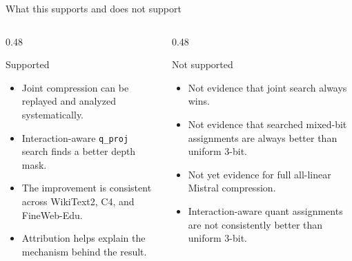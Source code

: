 \documentclass[aspectratio=169]{beamer}
\begin{document}
\begin{frame}{What this supports and does not support}
\begin{columns}[T]
\begin{column}{0.48\textwidth}
\begin{block}{Supported}
\begin{itemize}
    \item Joint compression can be replayed and analyzed systematically.
    \item Interaction-aware \texttt{q\_proj} search finds a better depth mask.
    \item The improvement is consistent across WikiText2, C4, and FineWeb-Edu.
    \item Attribution helps explain the mechanism behind the result.
\end{itemize}
\end{block}
\end{column}

\begin{column}{0.48\textwidth}
\begin{block}{Not supported}
\begin{itemize}
    \item Not evidence that joint search always wins.
    \item Not evidence that searched mixed-bit assignments are always better than uniform 3-bit.
    \item Not yet evidence for full all-linear Mistral compression.
    \item Interaction-aware quant assignments are not consistently better than uniform 3-bit.
\end{itemize}
\end{block}
\end{column}
\end{columns}
\end{frame}

\end{document}
